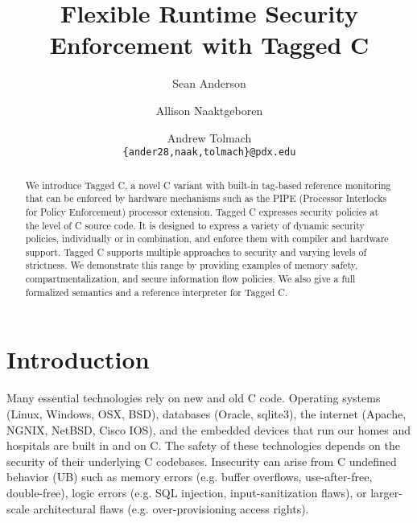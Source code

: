 \documentclass{llncs}
\title{Flexible Runtime Security Enforcement with Tagged C}
\author{Sean Anderson \and Allison Naaktgeboren \and Andrew Tolmach\\
{\tt\{ander28,naak,tolmach\}@pdx.edu}}
\institute{Portland State University\\
Portland, OR, USA}
\begin{document}





\maketitle

\begin{abstract}
We introduce Tagged C, a novel C variant with
built-in tag-based reference monitoring that can be enforced by hardware
mechanisms such as the PIPE (Processor Interlocks for Policy Enforcement) processor extension.
Tagged C expresses security policies at the level of C source code.
It is designed to express a variety of dynamic security policies,  
individually or in combination, and enforce them with compiler and hardware support.
Tagged C supports multiple approaches to security and varying levels of strictness. We demonstrate
this range by providing examples of memory safety, compartmentalization,
and secure information flow policies. We also give a full formalized semantics
and a reference interpreter for Tagged C.
\end{abstract}


\section{Introduction}
Many essential technologies rely on new and old C code.
Operating systems (Linux, Windows, OSX, BSD), databases (Oracle, sqlite3), the internet
(Apache, NGNIX, NetBSD, Cisco IOS), and the 
embedded devices that run our homes and hospitals are built in and on C. %
The safety of these technologies
depends on the security of their underlying C codebases.
Insecurity can arise from C
undefined behavior (UB) such as memory errors (e.g. buffer overflows, use-after-free, double-free),
logic errors (e.g. SQL injection, input-sanitization flaws), or
larger-scale architectural flaws (e.g. over-provisioning access rights).
\end{document}
